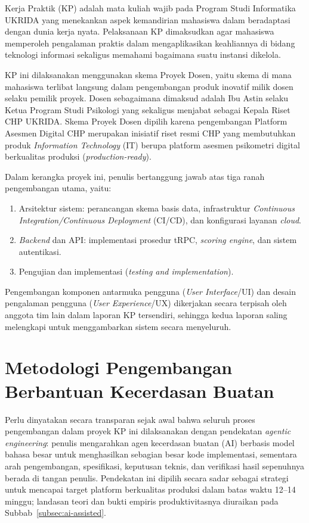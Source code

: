 Kerja Praktik (KP) adalah mata kuliah wajib pada Program Studi Informatika UKRIDA yang menekankan aspek kemandirian mahasiswa dalam beradaptasi dengan dunia kerja nyata. Pelaksanaan KP dimaksudkan agar mahasiswa memperoleh pengalaman praktis dalam mengaplikasikan keahliannya di bidang teknologi informasi sekaligus memahami bagaimana suatu instansi dikelola.

KP ini dilaksanakan menggunakan skema Proyek Dosen, yaitu skema di mana mahasiswa terlibat langsung dalam pengembangan produk inovatif milik dosen selaku pemilik proyek. Dosen sebagaimana dimaksud adalah Ibu Astin selaku Ketua Program Studi Psikologi yang sekaligus menjabat sebagai Kepala Riset CHP UKRIDA. Skema Proyek Dosen dipilih karena pengembangan Platform Asesmen Digital CHP merupakan inisiatif riset resmi CHP yang membutuhkan produk \textit{Information Technology} (IT) berupa platform asesmen psikometri digital berkualitas produksi (\textit{production-ready}).

Dalam kerangka proyek ini, penulis bertanggung jawab atas tiga ranah pengembangan utama, yaitu:

\begin{enumerate}[leftmargin=2cm]
  \item Arsitektur sistem: perancangan skema basis data, infrastruktur \textit{Continuous Integration/Continuous Deployment} (CI/CD), dan konfigurasi layanan \textit{cloud}.
  \item \textit{Backend} dan API: implementasi prosedur tRPC, \textit{scoring engine}, dan sistem autentikasi.
  \item Pengujian dan implementasi (\textit{testing and implementation}).
\end{enumerate}

Pengembangan komponen antarmuka pengguna (\textit{User Interface}/UI) dan desain pengalaman pengguna (\textit{User Experience}/UX) dikerjakan secara terpisah oleh anggota tim lain dalam laporan KP tersendiri, sehingga kedua laporan saling melengkapi untuk menggambarkan sistem secara menyeluruh.

\section{Metodologi Pengembangan Berbantuan Kecerdasan Buatan}
\label{sec:metodologi-ai}

Perlu dinyatakan secara transparan sejak awal bahwa seluruh proses pengembangan dalam proyek KP ini dilaksanakan dengan pendekatan \textit{agentic engineering}: penulis mengarahkan agen kecerdasan buatan (AI) berbasis model bahasa besar untuk menghasilkan sebagian besar kode implementasi, sementara arah pengembangan, spesifikasi, keputusan teknis, dan verifikasi hasil sepenuhnya berada di tangan penulis. Pendekatan ini dipilih secara sadar sebagai strategi untuk mencapai target platform berkualitas produksi dalam batas waktu 12--14 minggu; landasan teori dan bukti empiris produktivitasnya diuraikan pada Subbab~\ref{subsec:ai-assisted}.


